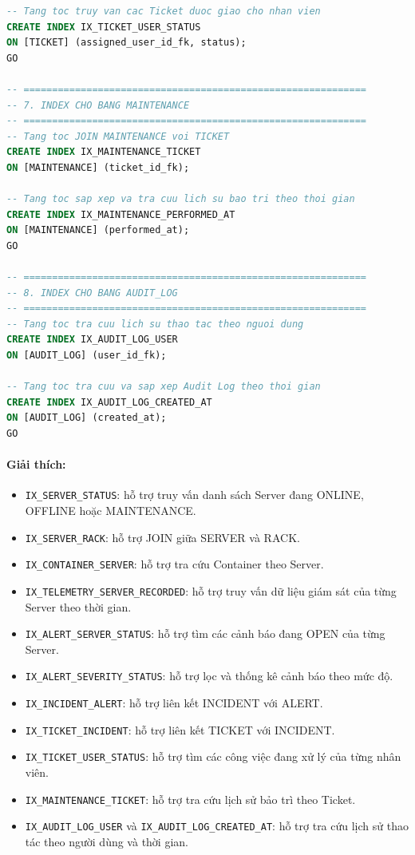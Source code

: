 \begin{lstlisting}[language=SQL]
-- Tang toc truy van cac Ticket duoc giao cho nhan vien
CREATE INDEX IX_TICKET_USER_STATUS
ON [TICKET] (assigned_user_id_fk, status);
GO

-- ============================================================
-- 7. INDEX CHO BANG MAINTENANCE
-- ============================================================
-- Tang toc JOIN MAINTENANCE voi TICKET
CREATE INDEX IX_MAINTENANCE_TICKET
ON [MAINTENANCE] (ticket_id_fk);

-- Tang toc sap xep va tra cuu lich su bao tri theo thoi gian
CREATE INDEX IX_MAINTENANCE_PERFORMED_AT
ON [MAINTENANCE] (performed_at);
GO

-- ============================================================
-- 8. INDEX CHO BANG AUDIT_LOG
-- ============================================================
-- Tang toc tra cuu lich su thao tac theo nguoi dung
CREATE INDEX IX_AUDIT_LOG_USER
ON [AUDIT_LOG] (user_id_fk);

-- Tang toc tra cuu va sap xep Audit Log theo thoi gian
CREATE INDEX IX_AUDIT_LOG_CREATED_AT
ON [AUDIT_LOG] (created_at);
GO
\end{lstlisting}

\paragraph{Giải thích:}
\begin{itemize}
    \item \texttt{IX\_SERVER\_STATUS}: hỗ trợ truy vấn danh sách Server đang ONLINE, OFFLINE hoặc MAINTENANCE.
    \item \texttt{IX\_SERVER\_RACK}: hỗ trợ JOIN giữa SERVER và RACK.
    \item \texttt{IX\_CONTAINER\_SERVER}: hỗ trợ tra cứu Container theo Server.
    \item \texttt{IX\_TELEMETRY\_SERVER\_RECORDED}: hỗ trợ truy vấn dữ liệu giám sát của từng Server theo thời gian.
    \item \texttt{IX\_ALERT\_SERVER\_STATUS}: hỗ trợ tìm các cảnh báo đang OPEN của từng Server.
    \item \texttt{IX\_ALERT\_SEVERITY\_STATUS}: hỗ trợ lọc và thống kê cảnh báo theo mức độ.
    \item \texttt{IX\_INCIDENT\_ALERT}: hỗ trợ liên kết INCIDENT với ALERT.
    \item \texttt{IX\_TICKET\_INCIDENT}: hỗ trợ liên kết TICKET với INCIDENT.
    \item \texttt{IX\_TICKET\_USER\_STATUS}: hỗ trợ tìm các công việc đang xử lý của từng nhân viên.
    \item \texttt{IX\_MAINTENANCE\_TICKET}: hỗ trợ tra cứu lịch sử bảo trì theo Ticket.
    \item \texttt{IX\_AUDIT\_LOG\_USER} và \texttt{IX\_AUDIT\_LOG\_CREATED\_AT}: hỗ trợ tra cứu lịch sử thao tác theo người dùng và thời gian.
\end{itemize}

